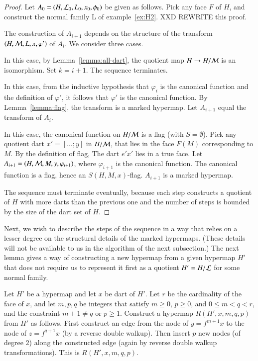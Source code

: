 \begin{proof}
Let $A_0=(H,{\cal L}_0,L_0,x_0,\phi_0)$ be given as follows.  Pick any face $F$ of $H$, and
construct the normal family {\cal L} of example~\ref{ex:H2}. 
XXD REWRITE this proof.

The construction of $A_{i+1}$ depends on the structure of the transform $(H,{\cal M},L,x,\varphi')$ of $A_i$.  We consider three
cases.
\begin{nomerate}
\item 
{}   In this case,  by
Lemma~\ref{lemma:all-dart}, the quotient map $H\to H/{\cal M}$ is an
isomorphism.  Set $k= i+1$. The sequence terminates.
\item 
{}  In this case,  from the inductive hypothesis that $\varphi_i$ is
the canonical function and the definition of $\varphi'$, it follows that $\varphi'$ is the canonical
function.  By Lemma~\ref{lemma:flag}, the transform is
a marked hypermap.  Let  $A_{i+1}$ equal the transform of $A_i$.
\item
{}
In this case, the canonical
function on $H/{\cal M}$ is a flag (with $S=\emptyset$).  Pick any quotient dart $x'=[\ldots;y]$ in $H/{\cal M}$, that
lies in the face $F(M)$ corresponding to $M$.  By the definition of flag,
The dart $e' x'$ lies in a true face.  Let
$A_{i+1} = (H,{\cal M},M,y,\varphi_{i+1})$, where $\varphi_{i+1}$ is the canonical function.
The canonical function is a flag, hence an $S(H,M,x)$-flag.  $A_{i+1}$ is a marked hypermap.
\end{nomerate}

The sequence must terminate eventually, because each step
constructs a quotient of $H$ with more darts than the previous one and
the number of steps is bounded by the size of the dart set of
$H$.
\end{proof}

Next, we wish to describe the steps of the sequence in a way that relies on a lesser degree
on the structural details of the marked hypermaps.  (These details will not be available to us
in the algorithm of the next subsection.)  The next lemma gives a way of constructing a new
hypermap from a given hypermap $H'$ that does not require us to  represent it first as a
quotient $H' = H/{\cal L}$ for some normal family.

\begin{definition}[R]\label{def:R}  
Let $H'$ be a hypermap and let $x$ be dart of $H'$.  Let  $r$ be the
cardinality of the face of $x$,
and let $m,p,q$ be integers that
satisfy $m\ge 0$, $p\ge 0$, and $0 \le m < q < r$,
and the  constraint  $m+1\ne q$ or $p\ge1$.  
Construct a hypermap $R(H',x,m,q,p)$ from $H'$ as follows.
First
construct an edge from the node of $y = f^{m+1} x$ to the node of $z =
f^{q+1} x$ (by a reverse double walkup).  Then insert $p$ new nodes (of
degree $2$) along the constructed edge (again by reverse double walkup transformations).  
This is $R(H',x,m,q,p)$.  
\end{definition}


